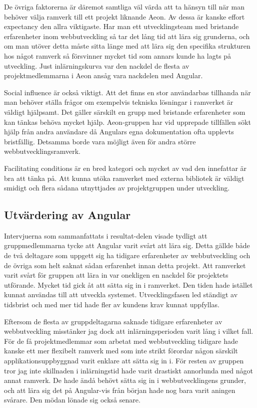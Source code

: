 De övriga faktorerna är däremot samtliga väl värda att ta hänsyn till när man behöver välja ramverk till ett projekt liknande Aeon. Av dessa är kanske effort expectancy den allra viktigaste. Har man ett utvecklingsteam med bristande erfarenheter inom webbutveckling så tar det lång tid att lära sig grunderna, och om man utöver detta måste sitta länge med att lära sig den specifika strukturen hos något ramverk så försvinner mycket tid som annars kunde ha lagts på utveckling. Just inlärningskurva var den nackdel de flesta av projektmedlemmarna i Aeon ansåg vara nackdelen med Angular.

Social influence är också viktigt. Att det finns en stor användarbas tillhanda när man behöver ställa frågor om exempelvis tekniska lösningar i ramverket är väldigt hjälpsamt. Det gäller särskilt en grupp med bristande erfarenheter som kan tänkas behöva mycket hjälp. Aeon-gruppen har vid upprepade tillfällen sökt hjälp från andra användare då Angulars egna dokumentation ofta upplevts bristfällig. Detsamma borde vara möjligt även för andra större webbutvecklingsramverk.

Facilitating conditions är en bred kategori och mycket av vad den innefattar är bra att tänka på. Att kunna utöka ramverket med externa bibliotek är väldigt smidigt och flera sådana utnyttjades av projektgruppen under utveckling. 




\subsection{Utvärdering av Angular}

Intervjuerna som sammanfattats i resultat-delen visade tydligt att gruppmedlemmarna tycke att Angular varit svårt att lära sig. Detta gällde både de två deltagare som uppgett sig ha tidigare erfarenheter av webbutveckling och de övriga som helt saknat sådan erfarenhet innan detta projekt. Att ramverket varit svårt för gruppen att lära in var onekligen en nackdel för projektets utförande. Mycket tid gick åt att sätta sig in i ramverket. Den tiden hade istället kunnat användas till att utveckla systemet. Utvecklingsfasen led ständigt av tidsbrist och med mer tid hade fler av kundens krav kunnat uppfyllas.

Eftersom de flesta av gruppdeltagarna saknade tidigare erfarenheter av webbutveckling misstänker jag dock att inlärningsperioden varit lång i vilket fall. För de få projektmedlemmar som arbetat med webbutveckling tidigare hade kanske ett mer flexibelt ramverk med som inte strikt förordar någon särskilt applikationsuppbyggnad varit enklare att sätta sig in i. För resten av gruppen tror jag inte skillnaden i inlärningstid hade varit drastiskt annorlunda med något annat ramverk. De hade ändå behövt sätta sig in i webbutvecklingens grunder, och att lära sig det på Angular-vis från början hade nog bara varit aningen svårare. Den mödan lönade sig också senare.

